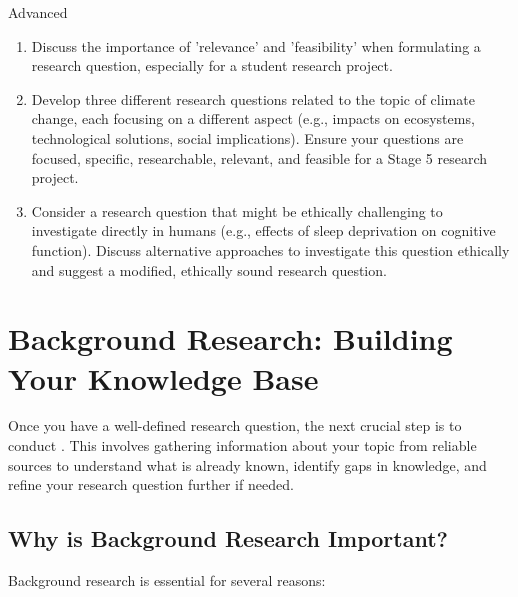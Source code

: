 \begin{tieredquestions}{Advanced}
\begin{enumerate}
    \item  Discuss the importance of 'relevance' and 'feasibility' when formulating a research question, especially for a student research project.
    \item  Develop three different research questions related to the topic of climate change, each focusing on a different aspect (e.g., impacts on ecosystems, technological solutions, social implications). Ensure your questions are focused, specific, researchable, relevant, and feasible for a Stage 5 research project.
    \item  Consider a research question that might be ethically challenging to investigate directly in humans (e.g., effects of sleep deprivation on cognitive function).  Discuss alternative approaches to investigate this question ethically and suggest a modified, ethically sound research question. 
\end{enumerate}

\section{Background Research: Building Your Knowledge Base}

Once you have a well-defined research question, the next crucial step is to conduct . This involves gathering information about your topic from reliable sources to understand what is already known, identify gaps in knowledge, and refine your research question further if needed.

\subsection{Why is Background Research Important?}

Background research is essential for several reasons:


\end{tieredquestions}
